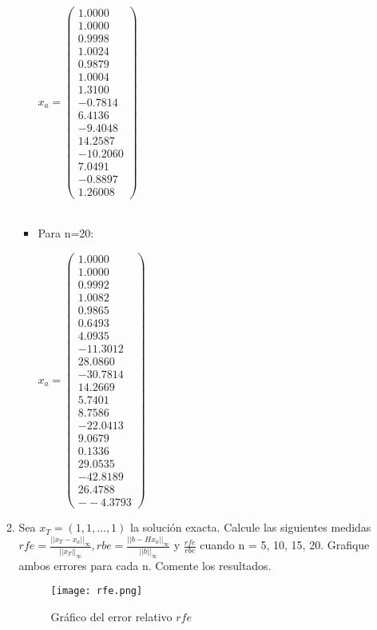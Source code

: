 \documentclass{udpreport}
\begin{document}
\begin{enumerate}
\begin{enumerate}
\begin{itemize}
 				$x_{a} = \left(\begin{array}{c} 1.0000\\ 1.0000\\ 0.9998\\ 1.0024\\ 0.9879\\1.0004\\ 1.3100\\ -0.7814\\  6.4136\\ -9.4048\\ 14.2587\\ -10.2060\\  7.0491\\  -0.8897\\  1.26008 \end{array}\right)$
 				\\
 				\\
 
 				\item Para n=20:
 				
 				$x_{a} = \left(\begin{array}{c} 1.0000\\ 1.0000\\ 0.9992\\ 1.0082\\ 0.9865\\ 0.6493\\ 4.0935\\-11.3012\\ 28.0860\\  -30.7814\\14.2669\\  5.7401\\  8.7586\\-22.0413\\ 9.0679\\  0.1336\\ 29.0535\\ -42.8189\\  26.4788\\ - -4.3793\end{array}\right)$
 			\end{itemize}
 			\item Sea $x_{T} = (1, 1, . . . , 1)$ la solución exacta. Calcule las siguientes medidas $rfe = \frac{||x_{T}-x_{a}||_{\infty}}{||x_{T}||_{\infty}} , rbe = \frac{||b-Hx_{a}||_{\infty}}{||b||_{\infty}}$ y $\frac{rfe}{rbe}$ cuando n = 5, 10, 15, 20. Grafique ambos errores para cada n. Comente los
resultados.
 			\begin{figure}[H]
 				\centering
 				\texttt{[image: rfe.png]}
 				\caption{Gráfico del error relativo $rfe$}	
 			\end{figure}
 			

\end{enumerate}
\end{enumerate}
\end{document}
